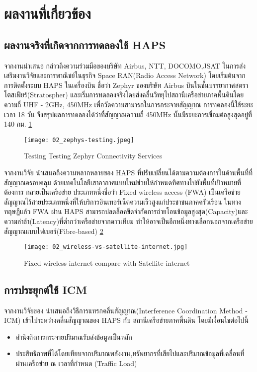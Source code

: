 \section{ผลงานที่เกี่ยวข้อง}

\subsection{ผลงานจริงที่เกิดจากการทดลองใช้ HAPS}
จากงานนำเสนอ \cite[Spacecompass]{HAPS Strategy of Space Compass}
กล่าวถึงความร่วมมือของบริษัท Airbus, NTT, DOCOMO,JSAT ในการส่งเสริมงานวิจัยและการพาณิชย์ในธุรกิจ Space RAN(Radio Access Network)
โดยเริ่มต้นจากการติดตั้งระบบ HAPS ในเครื่องบิน ชื่อว่า Zephyr ของบริษัท Airbus บินในชั้นบรรยากาศสตราโตสเฟียร์(Stratospher) 
และเริ่มการทดลองจริงโดยส่งคลื่นวิทยุไปสถานีเครือข่ายภาคพื้นดินโดยความถี่
UHF - 2GHz, 450MHz เพื่อวัดความสามารถในการกระจายสัญญาณ การทดลองนี้ใช้ระยะเวลา 18 วัน 
จึงสรุปผลการทดลองได้ว่าที่สัญญาณความถี่ 450MHz นั้นมีระยะการเชื่อมต่อสูงสุดอยู่ที่ 140 กม. \ref{fig:02-zephyr-testing}

\begin{figure}[h]
\centering
\caption[Testing Zephyr]{Testing Testing Zephyr Connectivity Services} 
\label{fig:02-zephyr-testing}
\texttt{[image: 02\_zephys-testing.jpeg]}
\end{figure}

จากงานวิจัย \cite[Towers]{High Altitude Platform Systems: Towers in the Skies}
นำเสนอถึงความหลากหลายของ HAPS ที่ปรับเปลี่ยนได้ตามความต้องการในด้านพื้นที่ที่สัญญาณครอบคลุม ด้วยเทคโนโลยีเสาอากาศแบบใหม่ช่วยให้กำหนดทิศทางไปยังพื้นที่เป้าหมายที่ต้องการ กลายเป็นเครือข่าย
ประเภทหนึ่งชื่อว่า Fixed wireless access (FWA) เป็นเครือข่ายสัญญาณไร้สายประเภทหนึ่งที่ให้บริการอินเทอร์เน็ตความเร็วสูงแก่ประชาชนภาคครัวเรือน ในทางทฤษฎีแล้ว
FWA ผ่าน HAPS สามารถปลดล็อคขีดจำกัดการถ่ายโอนข้อมูลสูงสุด(Capacity)และความล่าช้า(Latency)ที่ต่ำกว่าเครือข่ายจากดาวเทียม
ทำให้อาจเป็นอีกหนึ่งทางเลือกนอกจากเครือข่ายสัญญาณแบบไฟเบอร์(Fibre-based) \ref{fig:02-wireless-vs-satellite}

\begin{figure}[h]
\centering
\caption[wireless vs satellite]{Fixed wireless internet compare with Satellite internet}
\label{fig:02-wireless-vs-satellite}
\texttt{[image: 02\_wireless-vs-satellite-internet.jpg]}
\end{figure}

\subsection{การประยุกต์ใช้ ICM}
จากงานวิจัยของ \cite[liu2021interference]{Interference Coordination Method for Integrated HAPS-Terrestrial Networks}
นำเสนอถึงวิธีการแทรกคลื่นสัญญาณ(Interference Coordination Method - ICM) เข้าไประหว่างคลื่นสัญญาณของ HAPS กับ สถานีเครือข่ายภาคพื้นดิน โดยมีเงื่อนไขต่อไปนี้
\begin{itemize}
    \item คำนึงถึงการกระจายปริมาณรับส่งข้อมูลเป็นหลัก 
    \item ประสิทธิภาพที่ได้โดยเทียบจากปริมาณพลังงาน,ทรัพยากรที่เสียไปและปริมาณข้อมูลที่เคลื่อนที่ผ่านเครือข่าย ณ เวลาที่กำหนด (Traffic Load)
\end{itemize}